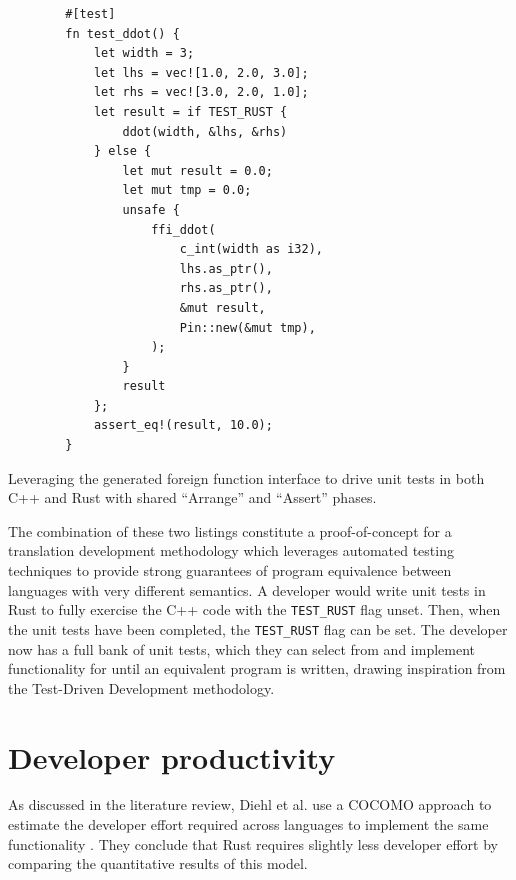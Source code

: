 \begin{code}
    \begin{verbatim}
        #[test]
        fn test_ddot() {
            let width = 3;
            let lhs = vec![1.0, 2.0, 3.0];
            let rhs = vec![3.0, 2.0, 1.0];
            let result = if TEST_RUST {
                ddot(width, &lhs, &rhs)
            } else {
                let mut result = 0.0;
                let mut tmp = 0.0;
                unsafe {
                    ffi_ddot(
                        c_int(width as i32),
                        lhs.as_ptr(),
                        rhs.as_ptr(),
                        &mut result,
                        Pin::new(&mut tmp),
                    );
                }
                result
            };
            assert_eq!(result, 10.0);
        }
    \end{verbatim}
    \caption{Leveraging the generated foreign function interface to drive unit tests in both C++ and Rust with shared ``Arrange'' and ``Assert'' phases.}
    \label{listing:rust-autocxx-unit-test}
\end{code}

The combination of these two listings constitute a proof-of-concept for a translation development methodology which leverages automated testing techniques to provide strong guarantees of program equivalence between languages with very different semantics. A developer would write unit tests in Rust to fully exercise the C++ code with the \texttt{TEST_RUST} flag unset. Then, when the unit tests have been completed, the \texttt{TEST_RUST} flag can be set. The developer now has a full bank of unit tests, which they can select from and implement functionality for until an equivalent program is written, drawing inspiration from the Test-Driven Development methodology.



\section{Developer productivity}
\label{sec:developer-productivity}

As discussed in the literature review, Diehl et al. use a \acrshort{COCOMO} approach to estimate the developer effort required across languages to implement the same functionality \cite{diehlBenchmarkingParallel1D2023}. They conclude that Rust requires slightly less developer effort by comparing the quantitative results of this model.

